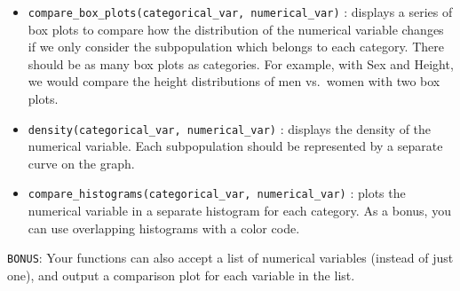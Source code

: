 \documentclass[]{article}
\begin{document}
\begin{itemize}
\item
  \texttt{compare\_box\_plots(categorical\_var,\ numerical\_var)} :
  displays a series of box plots to compare how the distribution of the
  numerical variable changes if we only consider the subpopulation which
  belongs to each category. There should be as many box plots as
  categories. For example, with Sex and Height, we would compare the
  height distributions of men vs.~women with two box plots.
\item
  \texttt{density(categorical\_var,\ numerical\_var)} : displays the
  density of the numerical variable. Each subpopulation should be
  represented by a separate curve on the graph.
\item
  \texttt{compare\_histograms(categorical\_var,\ numerical\_var)} :
  plots the numerical variable in a separate histogram for each
  category. As a bonus, you can use overlapping histograms with a color
  code.
\end{itemize}

\texttt{BONUS}: Your functions can also accept a list of numerical
variables (instead of just one), and output a comparison plot for each
variable in the list.

\clearpage
\end{document}
